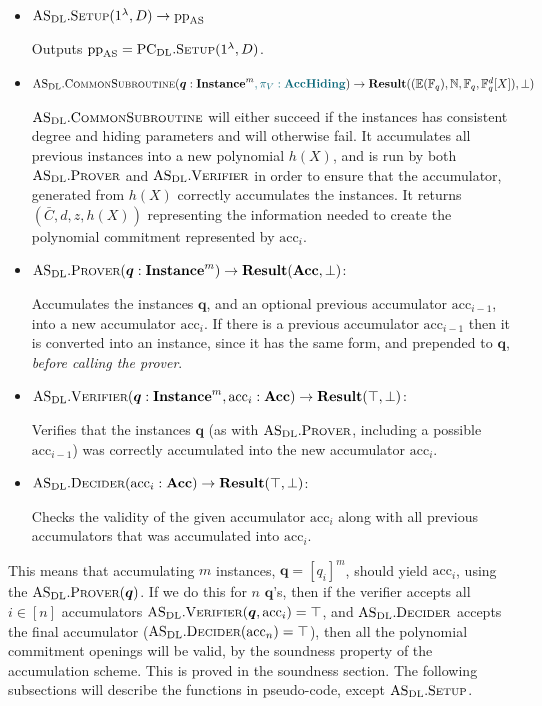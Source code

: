 \documentclass[
]{article}
\newcommand*\Fb{\mathbb{F}}
\newcommand*\Nb{\mathbb{N}}
\newcommand*\Eb{\mathbb{E}}
\renewcommand*\l{\lambda}
\newcommand{\mathblue}[1]{\mathcolor{GbBlueDk}{#1}}
\renewcommand{\vec}[1]{ \boldsymbol{#1} }
\newcommand*{\pp}{\mathrm{pp}}
\newcommand*{\acc}{\mathrm{acc}}
\newcommand*{\Setup}{\mathrm{\text{S{\scriptsize ETUP}}}}
\newcommand*{\AS}{\text{AS}}
\newcommand*{\PCDL}{\text{PC}_{\text{DL}}}
\newcommand*{\PCDLSetup}{\PCDL.\Setup}
\newcommand*{\ASDL}{\text{AS}_{\text{DL}}}
\newcommand*{\ASDLSetup}{\ASDL.\Setup}
\newcommand*{\ASDLCommonSubroutine}{\ASDL.\mathrm{\text{C{\scriptsize OMMON}S{\scriptsize UBROUTINE}}}}
\newcommand*{\ASDLProver}{\ASDL.\mathrm{\text{P\scriptsize ROVER}}}
\newcommand*{\ASDLVerifier}{\ASDL.\mathrm{\text{V\scriptsize ERIFIER}}}
\newcommand*{\ASDLDecider}{\ASDL.\mathrm{\text{D\scriptsize ECIDER}}}
\newcommand*\Result{\mathbf{Result}}
\newcommand*\Acc{\mathbf{Acc}}
\newcommand*\Instance{\mathbf{Instance}}
\newcommand*\AccHiding{\mathbf{AccHiding}}
\begin{document}
\begin{itemize}
\item
  \(\ASDLSetup(1^\l, D) \to \pp_\AS\)

  Outputs \(\pp_\AS = \PCDLSetup(1^\l, D)\).
\item
  \(\ASDLCommonSubroutine(\vec{q}: \Instance^m \mathblue{, \pi_V: \AccHiding}) \to \Result((\Eb(\Fb_q), \Nb, \Fb_q, \Fb^d_q[X]), \bot)\)

  \(\ASDLCommonSubroutine\) will either succeed if the instances has
  consistent degree and hiding parameters and will otherwise fail. It
  accumulates all previous instances into a new polynomial \(h(X)\), and
  is run by both \(\ASDLProver\) and \(\ASDLVerifier\) in order to
  ensure that the accumulator, generated from \(h(X)\) correctly
  accumulates the instances. It returns \((\bar{C}, d, z, h(X))\)
  representing the information needed to create the polynomial
  commitment represented by \(\acc_i\).
\item
  \(\ASDLProver(\vec{q}: \Instance^m) \to \Result(\Acc, \bot)\):

  Accumulates the instances \(\vec{q}\), and an optional previous
  accumulator \(\acc_{i-1}\), into a new accumulator \(\acc_i\). If
  there is a previous accumulator \(\acc_{i-1}\) then it is converted
  into an instance, since it has the same form, and prepended to
  \(\vec{q}\), \emph{before calling the prover}.
\item
  \(\ASDLVerifier(\vec{q}: \Instance^m, \acc_i: \Acc) \to \Result(\top, \bot)\):

  Verifies that the instances \(\vec{q}\) (as with \(\ASDLProver\),
  including a possible \(\acc_{i-1}\)) was correctly accumulated into
  the new accumulator \(\acc_i\).
\item
  \(\ASDLDecider(\acc_i: \Acc) \to \Result(\top, \bot)\):

  Checks the validity of the given accumulator \(\acc_i\) along with all
  previous accumulators that was accumulated into \(\acc_i\).
\end{itemize}

This means that accumulating \(m\) instances, \(\vec{q} = [q_i]^m\),
should yield \(\acc_i\), using the \(\ASDLProver(\vec{q})\). If we do
this for \(n\) \(\vec{q}\)'s, then if the verifier accepts all
\(i \in [n]\) accumulators \(\ASDLVerifier(\vec{q}, \acc_i) = \top\),
and \(\ASDLDecider\) accepts the final accumulator
(\(\ASDLDecider(\acc_n) = \top\)), then all the polynomial commitment
openings will be valid, by the soundness property of the accumulation
scheme. This is proved in the soundness section. The following
subsections will describe the functions in pseudo-code, except
\(\ASDLSetup\).
\end{document}
